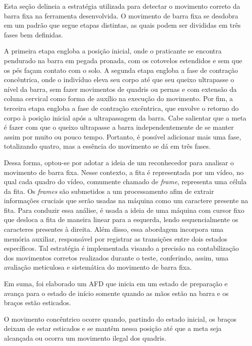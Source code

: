Esta seção delineia a estratégia utilizada para detectar o movimento correto da barra fixa na ferramenta desenvolvida. O movimento de barra fixa se desdobra em um padrão que segue etapas distintas, as quais podem ser divididas em três fases bem definidas. 

A primeira etapa engloba a posição inicial, onde o praticante se encontra pendurado na barra em pegada pronada, com os cotovelos estendidos e sem que os pés façam contato com o solo. A segunda etapa engloba a fase de contração concêntrica, onde o indivíduo eleva seu corpo até que seu queixo ultrapasse o nível da barra, sem fazer movimentos de quadris ou pernas e com extensão da coluna cervical como forma de auxílio na execução do movimento. Por fim, a terceira etapa engloba a fase de contração excêntrica, que envolve o retorno do corpo à posição inicial após a ultrapassagem da barra. Cabe salientar que a meta é fazer com que o queixo ultrapasse a barra independentemente de se manter assim por muito ou pouco tempo. Portanto, é possível adicionar mais uma fase, totalizando quatro, mas a essência do movimento se dá em três fases.

Dessa forma, optou-se por adotar a ideia de um reconhecedor para analisar o movimento de barra fixa. Nesse contexto, a fita é representada por um vídeo, no qual cada quadro do vídeo, comumente chamado de \textit{frame}, representa uma célula da fita. Os \textit{frames} são submetidos a um processamento afim de extrair informações cruciais que serão usadas na máquina como um caractere presente na fita. Para conduzir essa análise, é usada a ideia de uma máquina com cursor fixo que desloca a fita de maneira linear para a esquerda, lendo sequencialmente os caracteres presentes à direita. Além disso, essa abordagem incorpora uma memória auxiliar, responsável por registrar as transições entre dois estados específicos. Tal estratégia é implementada visando a precisão na contabilização dos movimentos corretos realizados durante o teste, conferindo, assim, uma avaliação meticulosa e sistemática do movimento de barra fixa.

Em suma, foi elaborado um \ac{AFD} que inicia em um estado de preparação e avança para o estado de início somente quando as mãos estão na barra e os braços estão esticados.

O movimento concêntrico ocorre quando, partindo do estado inicial, os braços deixam de estar esticados e se mantêm nessa posição até que a meta seja alcançada ou ocorra um movimento ilegal dos quadris.

